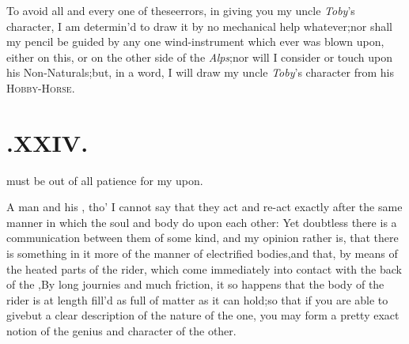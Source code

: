 \documentclass{article}
\begin{document}
To avoid all and every one of these\break errors, in giving you my
uncle \textit{Toby}’s character, I am determin’d to draw it
by
no mechanical help whatever;\tsh  nor shall my pencil be guided by
any one wind-instrument which ever was blown upon, either on this,
or on the other side of the \textit{Alps};\tsk  nor will I
consider\break
{}
or touch upon his
Non-Naturals;\tsk but, in a word, I will draw my uncle
\textit{Toby}’s character from his
\textsc{Hobby-Horse}.


\null
\section{.\enspace XXIV.}

  must be out of all patience for my\break
{}
\break 
upon.

A man and his ,\break
tho’ I cannot say that they act and re-act exactly after the
same manner in which the soul and body do upon each other: Yet
doubtless there is a communication between them of some kind, and
my\break
opinion rather is, that there is something in it more of the
manner of electrified bodies,\tsk  and that, by means of the
heated parts of the rider, which come immediately into contact with
the back of the ,\tsk  By
long journies and much friction, it so happens that the bo\-dy of
the rider is at length fill’d as full of
 matter as it can
hold;\tsk  so that if you are able to give\break but a clear description of the nature
of the one, you may form a pretty exact notion of the genius and
character of the other.
\end{document}

